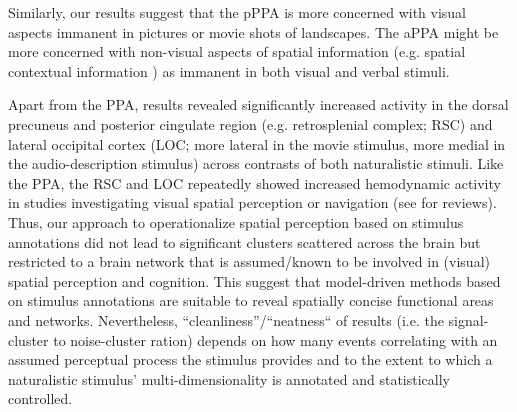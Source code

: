 \documentclass[english]{article}
\begin{document}
Similarly, our results suggest that the pPPA is more concerned with visual
aspects immanent in pictures or movie shots of landscapes.
The aPPA might be more concerned with non-visual aspects of spatial information
(e.g. spatial contextual information \citep{aminoff2013role,
aminoff2015associative, baumann2016functional}) as immanent in both visual and
verbal stimuli.


Apart from the PPA, results revealed significantly increased activity in the
dorsal precuneus and posterior cingulate region (e.g. retrosplenial complex;
RSC) and lateral occipital cortex (LOC; more lateral in the movie stimulus, more
medial in the audio-description stimulus) across contrasts of both naturalistic stimuli.
Like the PPA, the RSC and LOC repeatedly showed increased hemodynamic activity
in studies investigating visual spatial perception or navigation (see
\citep{chrastil2018heterogeneity, bettencourt2013role} for reviews).
Thus, our approach to operationalize spatial perception based on stimulus
annotations did not lead to significant clusters scattered across the brain but
restricted to a brain network that is assumed/known to be involved in (visual)
spatial perception and cognition.
%
This suggest that model-driven methods based on stimulus annotations are
suitable to reveal spatially concise functional areas and networks.
%
Nevertheless, ``cleanliness''/``neatness``  of results (i.e. the signal-cluster
to noise-cluster ration) depends on how many
events correlating with an assumed perceptual process the stimulus provides and
to the extent to which a naturalistic stimulus' multi-dimensionality is
annotated and statistically controlled.
\end{document}

